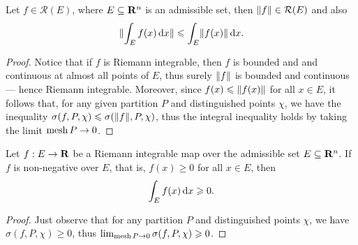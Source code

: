 \begin{proposition}[Estimate]
    \label{prop:norm-of-integral-less-integral-of-norm}
    Let \(f \in \mathcal R(E)\), where \(E \subseteq \mathbf{R}^{n}\) is an admissible set,
    then \(\lVert f\rVert \in \mathcal R(E)\) and also
    \[
        \lVert\int_E f(x)\, \mathrm{d} x\rVert \leqslant \int_E \lVert f(x)\rVert\, \mathrm{d} x.
    \]
\end{proposition}

\begin{proof}
    Notice that if \(f\) is Riemann integrable, then \(f\) is bounded and and
    continuous at almost all points of \(E\), thus surely \(\lVert f\rVert\) is bounded and
    continuous --- hence Riemann integrable. Moreover, since \(f(x) \leqslant
    \lVert f(x)\rVert\) for all \(x \in E\), it follows that, for any given partition
    \(P\) and distinguished points \(\chi\), we have the inequality \(\sigma(f, P,
    \chi) \leqslant \sigma(\lVert f\rVert, P, \chi)\), thus the integral inequality holds by
    taking the limit \(\operatorname{mesh} P \to 0\).
\end{proof}

\begin{proposition}
    \label{prop:non-negative-real-valued-integral-non-negative}
    Let \(f: E \to \mathbf{R}\) be a Riemann integrable map over the admissible set \(E
    \subseteq \mathbf{R}^{n}\). If \(f\) is non-negative over \(E\), that is, \(f(x) \geq
    0\) for all \(x \in E\), then
    \[
        \int_E f(x)\, \mathrm{d} x \geqslant 0.
    \]
\end{proposition}

\begin{proof}
    Just observe that for any partition \(P\) and distinguished points \(\chi\), we
    have \(\sigma(f, P, \chi) \geq 0\), thus \(\lim_{\operatorname{mesh} P \to 0} \sigma(f, P,
    \chi) \geqslant 0\).
\end{proof}

